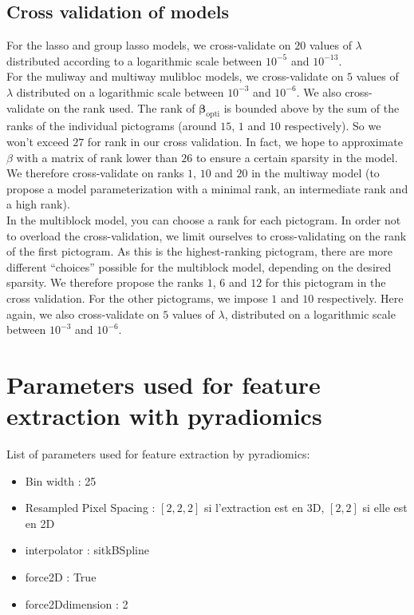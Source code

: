 \documentclass[preprint,12pt]{elsarticle}
\begin{document}
\subsection{Cross validation of models}

\noindent For the lasso and group lasso models, we cross-validate on $20$ values of $\lambda$ distributed according to a logarithmic scale between $10^{-5}$ and $10^{-13}$.\\
\indent For the muliway and multiway mulibloc models, we cross-validate on $5$ values of $\lambda$ distributed on a logarithmic scale between $10^{-3}$ and $10^{-6}$. We also cross-validate on the rank used. The rank of $\bm{\beta}_{\text{opti}}$ is bounded above by the sum of the ranks of the individual pictograms (around $15$, $1$ and $10$ respectively). So we won't exceed $27$ for rank in our cross validation. In fact, we hope to approximate $\beta$ with a matrix of rank lower than $26$ to ensure a certain sparsity in the model. We therefore cross-validate on ranks $1$, $10$ and $20$ in the multiway model (to propose a model parameterization with a minimal rank, an intermediate rank and a high rank).\\
\indent In the multiblock model, you can choose a rank for each pictogram. In order not to overload the cross-validation, we limit ourselves to cross-validating on the rank of the first pictogram. As this is the highest-ranking pictogram, there are more different “choices” possible for the multiblock model, depending on the desired sparsity. We therefore propose the ranks $1$, $6$ and $12$ for this pictogram in the cross validation. For the other pictograms, we impose $1$ and $10$ respectively. Here again, we also cross-validate on $5$ values of $\lambda$, distributed on a logarithmic scale between $10^{-3}$ and $10^{-6}$.





\newpage

\section{Parameters used for feature extraction with pyradiomics}
\label{annexeparam}

List of parameters used for feature extraction by pyradiomics:
 
\begin{itemize}[label = $\bullet$]
    \item Bin width : 25
    \item Resampled Pixel Spacing : $[2,2,2]$ si l'extraction est en 3D, $[2,2]$ si elle est en 2D
    \item interpolator : sitkBSpline
    \item force2D : True
    \item force2Ddimension : 2
\end{itemize}
\end{document}
